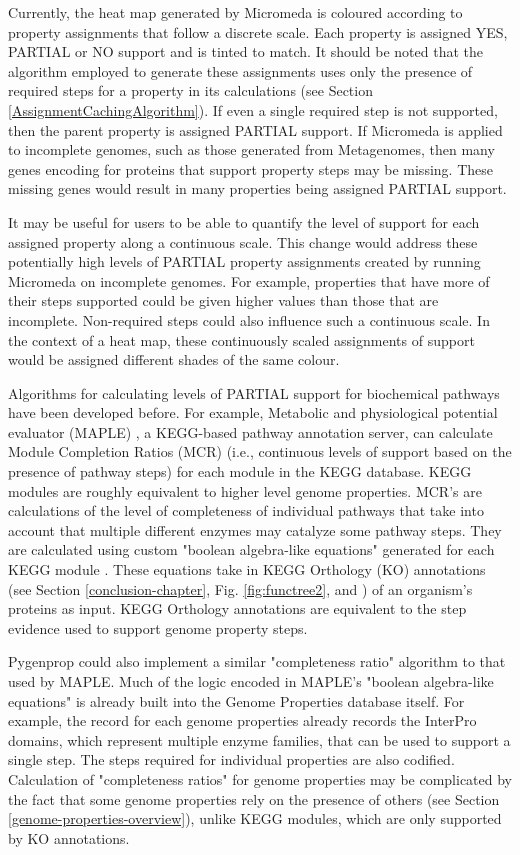 Currently, the heat map generated by Micromeda is coloured according to property assignments that follow a discrete scale. Each property is assigned YES, PARTIAL or NO support and is tinted to match. It should be noted that the algorithm employed to generate these assignments uses only the presence of required steps for a property in its calculations (see Section \ref{AssignmentCachingAlgorithm}). If even a single required step is not supported, then the parent property is assigned PARTIAL support. If Micromeda is applied to incomplete genomes, such as those generated from Metagenomes, then many genes encoding for proteins that support property steps may be missing. These missing genes would result in many properties being assigned PARTIAL support. 

It may be useful for users to be able to quantify the level of support for each assigned property along a continuous scale. This change would address these potentially high levels of PARTIAL property assignments created by running Micromeda on incomplete genomes. For example, properties that have more of their steps supported could be given higher values than those that are incomplete. Non-required steps could also influence such a continuous scale. In the context of a heat map, these continuously scaled assignments of support would be assigned different shades of the same colour.

Algorithms for calculating levels of PARTIAL support for biochemical pathways have been developed before. For example, Metabolic and physiological potential evaluator (MAPLE) \cite{takami2016automated}, a KEGG-based pathway annotation server, can calculate Module Completion Ratios (MCR) (i.e., continuous levels of support based on the presence of pathway steps) for each module in the KEGG database. KEGG modules are roughly equivalent to higher level genome properties. MCR's are calculations of the level of completeness of individual pathways that take into account that multiple different enzymes may catalyze some pathway steps. They are calculated using custom "boolean algebra-like equations" generated for each KEGG module \cite{takami2012evaluation}. These equations take in KEGG Orthology (KO) annotations (see Section \ref{conclusion-chapter}, Fig. \ref{fig:functree2}, and \cite{mao2005automated}) of an organism's proteins as input. KEGG Orthology annotations are equivalent to the step evidence used to support genome property steps. 

Pygenprop could also implement a similar "completeness ratio" algorithm to that used by MAPLE. Much of the logic encoded in MAPLE's "boolean algebra-like equations" is already built into the Genome Properties database itself. For example, the record for each genome properties already records the InterPro domains, which represent multiple enzyme families, that can be used to support a single step. The steps required for individual properties are also codified. Calculation of "completeness ratios" for genome properties may be complicated by the fact that some genome properties rely on the presence of others (see Section \ref{genome-properties-overview}), unlike KEGG modules, which are only supported by KO annotations.

